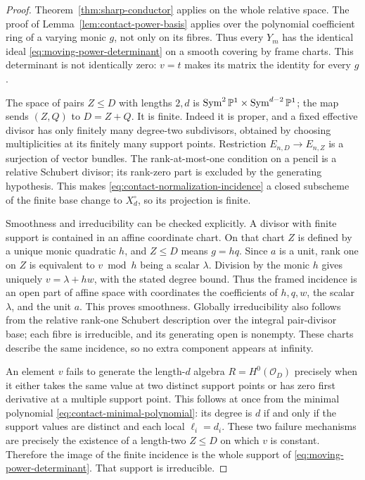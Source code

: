 \begin{proof}
Theorem~\ref{thm:sharp-conductor} applies on the whole relative
space. The proof of Lemma~\ref{lem:contact-power-basis} applies over
the polynomial coefficient ring of a varying monic $g$, not only
on its fibres. Thus every $Y_m$ has the identical ideal
\eqref{eq:moving-power-determinant} on a smooth covering by frame
charts. This determinant is not identically zero: $v=t$ makes its
matrix the identity for every $g$.

The space of pairs $Z\le D$ with lengths $2,d$ is
$\operatorname{Sym}^2\mathbb P^1\times\operatorname{Sym}^{d-2}\mathbb P^1$;
the map sends $(Z,Q)$ to $D=Z+Q$. It is finite. Indeed it is proper,
and a fixed effective divisor has only finitely many degree-two
subdivisors, obtained by choosing multiplicities at its finitely
many support points. Restriction $E_{n,D}\to E_{n,Z}$ is a
surjection of vector bundles. The rank-at-most-one condition on a
pencil is a relative Schubert divisor; its rank-zero part is
excluded by the generating hypothesis. This makes
\eqref{eq:contact-normalization-incidence} a closed subscheme of
the finite base change to $X_d^\circ$, so its projection is finite.

Smoothness and irreducibility can be checked explicitly. A divisor
with finite support is contained in an affine coordinate chart. On
that chart $Z$ is defined by a unique monic quadratic $h$, and
$Z\le D$ means $g=hq$. Since $a$ is a unit, rank one on $Z$ is
equivalent to $v\bmod h$ being a scalar $\lambda$. Division by the
monic $h$ gives uniquely $v=\lambda+hw$, with the stated degree
bound. Thus the framed incidence is an open part of affine space
with coordinates the coefficients of $h,q,w$, the scalar $\lambda$,
and the unit $a$. This proves smoothness. Globally irreducibility
also follows from the relative rank-one Schubert description over
the integral pair-divisor base; each fibre is irreducible, and its
generating open is nonempty. These charts describe the same
incidence, so no extra component appears at infinity.

An element $v$ fails to generate the length-$d$ algebra
$R=H^0(\mathcal O_D)$ precisely when it either takes the same value
at two distinct support points or has zero first derivative at a
multiple support point. This follows at once from the minimal
polynomial \eqref{eq:contact-minimal-polynomial}: its degree is $d$
if and only if the support values are distinct and each local
$\ell_i=d_i$. These two failure mechanisms are precisely the
existence of a length-two $Z\le D$ on which $v$ is constant.
Therefore the image of the finite incidence is the whole support
of \eqref{eq:moving-power-determinant}. That support is irreducible.


\end{proof}
